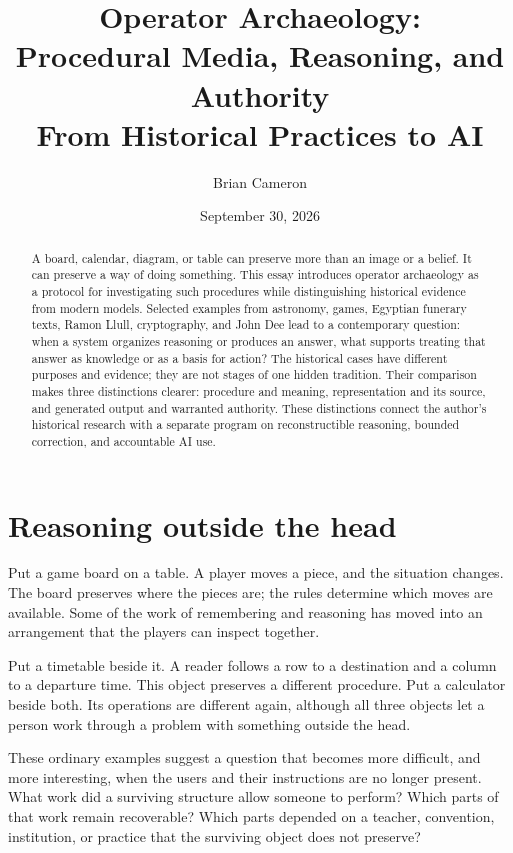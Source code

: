 \documentclass[11pt]{article}
\title{Operator Archaeology:\\Procedural Media, Reasoning, and Authority\\
\large From Historical Practices to AI}
\author{Brian Cameron}
\date{September 30, 2026}
\begin{document}
\maketitle
\begin{abstract}
A board, calendar, diagram, or table can preserve more than an image or a belief.
It can preserve a way of doing something. This essay introduces operator
archaeology as a protocol for investigating such procedures while distinguishing
historical evidence from modern models. Selected examples from astronomy,
games, Egyptian funerary texts, Ramon Llull, cryptography, and John Dee lead
to a contemporary question: when a system organizes reasoning or produces
an answer, what supports treating that answer as knowledge or as a basis for
action? The historical cases have different purposes and evidence; they are
not stages of one hidden tradition. Their comparison makes three distinctions
clearer: procedure and meaning, representation and its source, and generated
output and warranted authority. These distinctions connect the author's
historical research with a separate program on reconstructible reasoning,
bounded correction, and accountable AI use.
\end{abstract}

\section{Reasoning outside the head}

Put a game board on a table. A player moves a piece, and the situation changes.
The board preserves where the pieces are; the rules determine which moves are
available. Some of the work of remembering and reasoning has moved into an
arrangement that the players can inspect together.

Put a timetable beside it. A reader follows a row to a destination and a column
to a departure time. This object preserves a different procedure. Put a
calculator beside both. Its operations are different again, although all three
objects let a person work through a problem with something outside the head.

These ordinary examples suggest a question that becomes more difficult, and
more interesting, when the users and their instructions are no longer present.
What work did a surviving structure allow someone to perform? Which parts of
that work remain recoverable? Which parts depended on a teacher, convention,
institution, or practice that the surviving object does not preserve?
\end{document}
